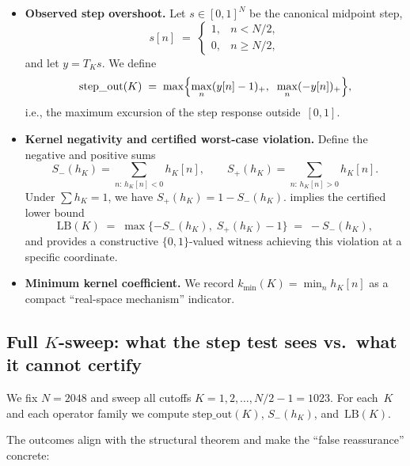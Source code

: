 \documentclass[11pt,a4paper]{article}
\theoremstyle{plain}
\theoremstyle{definition}
\theoremstyle{plain}
\newcommand{\Sminus}{S_{-}}
\newcommand{\Splus}{S_{+}}
\newcommand{\stepout}{\mathrm{step\_out}}
\begin{document}
\begin{itemize}[leftmargin=2em]
  \item \textbf{Observed step overshoot.}  Let $s \in [0,1]^N$ be the canonical
    midpoint step,
    \[
      s[n] \;=\;
      \begin{cases}
        1, & n < N/2,\\
        0, & n \ge N/2,
      \end{cases}
    \]
    and let $y = T_K s$.  We define
    \[
      \stepout(K)
      \;=\;
      \max\Bigl\{\max_n (y[n]-1)_+,\;\;\max_n (-y[n])_+\Bigr\},
    \]
    i.e., the maximum excursion of the step response outside~$[0,1]$.

  \item \textbf{Kernel negativity and certified worst-case violation.}  Define
    the negative and positive sums
    \[
      \Sminus(h_K) = \sum_{n:\,h_K[n]<0} h_K[n],
      \qquad
      \Splus(h_K) = \sum_{n:\,h_K[n]>0} h_K[n].
    \]
    Under $\sum h_K = 1$, we have $\Splus(h_K) = 1 - \Sminus(h_K)$.
     implies the certified lower bound
    \[
      \mathrm{LB}(K)
      \;=\;
      \max\{-\Sminus(h_K),\;\Splus(h_K) - 1\}
      \;=\;
      -\Sminus(h_K),
    \]
    and provides a constructive $\{0,1\}$-valued witness achieving this
    violation at a specific coordinate.

  \item \textbf{Minimum kernel coefficient.}  We record
    $k_{\min}(K) = \min_n h_K[n]$ as a compact ``real-space mechanism''
    indicator.
\end{itemize}


\subsection{Full $K$-sweep: what the step test sees vs.\ what it cannot certify}
\label{sec:full-sweep}

We fix $N = 2048$ and sweep all cutoffs $K = 1, 2, \dots, N/2-1 = 1023$.  For
each~$K$ and each operator family we compute $\stepout(K)$, $\Sminus(h_K)$,
and~$\mathrm{LB}(K)$.

The outcomes align with the structural theorem and make the ``false reassurance''
concrete:
\end{document}

